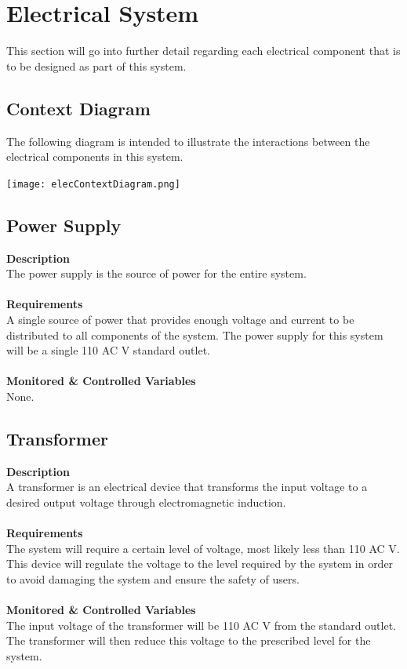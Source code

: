 \documentclass[titlepage]{article}
\begin{document}
\section{Electrical System}
This section will go into further detail regarding each electrical component that is to be designed as part of this system.
\subsection{Context Diagram}
The following diagram is intended to illustrate the interactions between the electrical components in this system.
\begin{center}
	\texttt{[image: elecContextDiagram.png]}
\label{fig:elecContextDiagramFig}
\end{center}

\subsection{Power Supply}
\textbf{Description}\\
The power supply is the source of power for the entire system.\\\\
\textbf{Requirements}\\
A single source of power that provides enough voltage and current to be distributed to all components of the system. The power supply for this system will be a single 110 AC V standard outlet.\\\\
\textbf{Monitored \& Controlled Variables}\\
None.

\newpage
\subsection{Transformer}
\textbf{Description}\\
A transformer is an electrical device that transforms the input voltage to a desired output voltage through electromagnetic induction.\\\\
\textbf{Requirements}\\
The system will require a certain level of voltage, most likely less than 110 AC V. This device will regulate the voltage to the level required by the system in order to avoid damaging the system and ensure the safety of users.\\\\
\textbf{Monitored \& Controlled Variables}\\
The input voltage of the transformer will be 110 AC V from the standard outlet. The transformer will then reduce this voltage to the prescribed level for the system.
\end{document}

